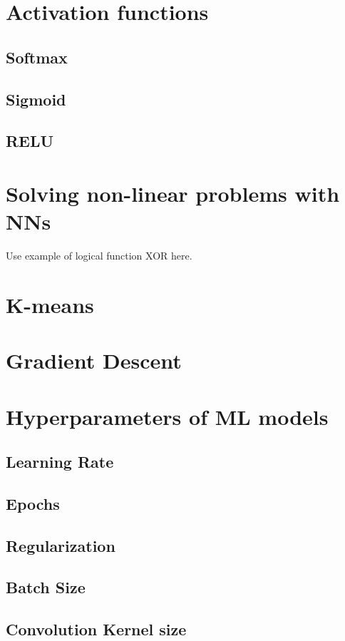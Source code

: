 \section{Activation functions}
\subsection{Softmax}
\subsection{Sigmoid}
\subsection{RELU}

\section{Solving non-linear problems with NNs}
Use example of logical function XOR here.

\section{K-means}

\section{Gradient Descent}

\section{Hyperparameters of ML models}

\subsection{Learning Rate}
\subsection{Epochs}
\subsection{Regularization}
\subsection{Batch Size}
\subsection{Convolution Kernel size}
